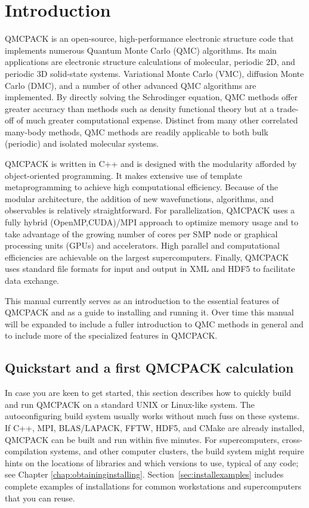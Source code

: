\chapter{Introduction}
\label{chap:introduction}

QMCPACK is an open-source, high-performance electronic structure code
that implements numerous Quantum Monte Carlo (QMC) algorithms. Its main
applications are electronic structure calculations of molecular,
periodic 2D, and periodic 3D solid-state systems. Variational Monte
Carlo (VMC), diffusion Monte Carlo (DMC), and a number of other
advanced QMC algorithms are implemented. By directly solving the
Schrodinger equation, QMC methods offer greater accuracy than methods
such as density functional theory but at a trade-off of much greater
computational expense. Distinct from many other correlated many-body
methods, QMC methods are readily applicable to both bulk
(periodic) and isolated molecular systems.

QMCPACK is written in C++ and is designed with the modularity afforded by
object-oriented programming. It makes extensive use of template
metaprogramming to achieve high computational efficiency. Because of the
modular architecture, the addition of new wavefunctions, algorithms,
and observables is relatively straightforward. For parallelization,
QMCPACK uses a fully hybrid (OpenMP,CUDA)/MPI approach to optimize
memory usage and to take advantage of the growing number of cores per
SMP node or graphical processing units (GPUs) and accelerators. High
parallel and computational efficiencies are achievable on the largest
supercomputers. Finally, QMCPACK uses standard file formats for
input and output in XML and HDF5 to facilitate data exchange.

This manual currently serves as an introduction to the essential features
of QMCPACK and as a guide to installing and running it. Over time this
manual will be expanded to include a fuller introduction to QMC
methods in general and to include more of the specialized features in
QMCPACK.

\section{Quickstart and a first QMCPACK calculation}
In case you are keen to get started, this section describes how to quickly
build and run QMCPACK on a standard UNIX or Linux-like system. The
autoconfiguring build system usually works without much fuss on these
systems.  If C++, MPI, BLAS/LAPACK, FFTW, HDF5, and CMake are already
installed, QMCPACK can be built and run within five minutes. For
supercomputers, cross-compilation systems, and other computer clusters,
the build system might require hints on the locations of libraries and
which versions to use, typical of any code; see Chapter
\ref{chap:obtaininginstalling}. Section~\ref{sec:installexamples}
includes complete examples of installations for common workstations and supercomputers that you can reuse.

